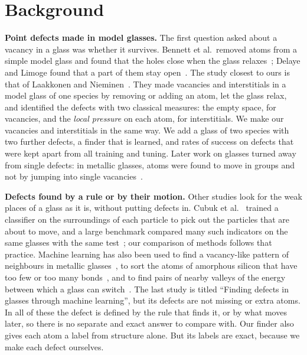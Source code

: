 \documentclass[10pt]{article}
\begin{document}
\section{Background}

\textbf{Point defects made in model glasses.} The first question asked about a vacancy in a glass was whether it survives. Bennett et al.\ removed atoms from a simple model glass and found that the holes close when the glass relaxes~\citep{bennett1979}; Delaye and Limoge found that a part of them stay open~\citep{delaye1993}. The study closest to ours is that of Laakkonen and Nieminen~\citep{laakkonen1988}. They made vacancies and interstitials in a model glass of one species by removing or adding an atom, let the glass relax, and identified the defects with two classical measures: the empty space, for vacancies, and the \emph{local pressure} on each atom, for interstitials. We make our vacancies and interstitials in the same way. We add a glass of two species with two further defects, a finder that is learned, and rates of success on defects that were kept apart from all training and tuning. Later work on glasses turned away from single defects: in metallic glasses, atoms were found to move in groups and not by jumping into single vacancies~\citep{faupel2003}.

\textbf{Defects found by a rule or by their motion.} Other studies look for the weak places of a glass as it is, without putting defects in. Cubuk et al.~\citep{cubuk2015} trained a classifier on the surroundings of each particle to pick out the particles that are about to move, and a large benchmark compared many such indicators on the same glasses with the same test~\citep{richard2020}; our comparison of methods follows that practice. Machine learning has also been used to find a vacancy-like pattern of neighbours in metallic glasses~\citep{yuan2023}, to sort the atoms of amorphous silicon that have too few or too many bonds~\citep{morrow2024}, and to find pairs of nearby valleys of the energy between which a glass can switch~\citep{ciarella2023}. The last study is titled ``Finding defects in glasses through machine learning'', but its defects are not missing or extra atoms. In all of these the defect is defined by the rule that finds it, or by what moves later, so there is no separate and exact answer to compare with. Our finder also gives each atom a label from structure alone. But its labels are exact, because we make each defect ourselves.
\end{document}
